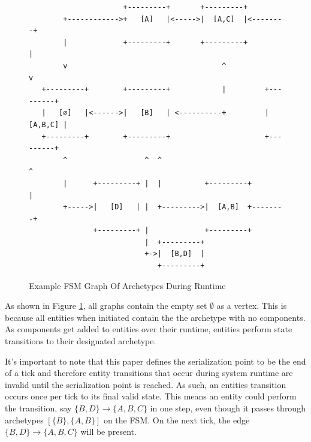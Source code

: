 \begin{figure}[htbp]
    \centering
    \begin{verbatim}
                      +---------+       +---------+                                  
        +------------>+   [A]   |<----->|  [A,C]  |<--------+                        
        |             +---------+       +---------+         |                        
        v                                    ^              v                        
   +---------+        +---------+            |         +---------+                   
   |   [∅]   |<------>|   [B]   | <----------+         | [A,B,C] |                   
   +---------+        +---------+                      +---------+                   
        ^                  ^  ^                             ^                        
        |      +---------+ |  |          +---------+        |                        
        +----->|   [D]   | |  +--------->|  [A,B]  +--------+                        
               +---------+ |             +---------+                                 
                           |  +---------+                                            
                           +->|  [B,D]  |                                            
                              +---------+                                            
    \end{verbatim}
    \caption{Example FSM Graph Of Archetypes During Runtime}
    \label{fig:graph1}
\end{figure}
                                                         
                                                         


As shown in Figure \ref{fig:graph1}, all graphs contain the empty set $\emptyset$ as a vertex. This is because all entities when initiated contain the the archetype with no components. As components get added to entities over their runtime, entities perform state transitions to their designated archetype.

It's important to note that this paper defines the serialization point to be the end of a tick and therefore entity transitions that occur during system runtime are invalid until the serialization point is reached. As such, an entities transition occurs once per tick to its final valid state. This means an entity could perform the transition, say $\{B,D\} \rightarrow \{A,B,C\}$ in one step, even though it passes through archetypes $[\{B\}, \{A,B\}]$ on the FSM. On the next tick, the edge $\{B,D\} \rightarrow \{A,B,C\}$ will be present. 

